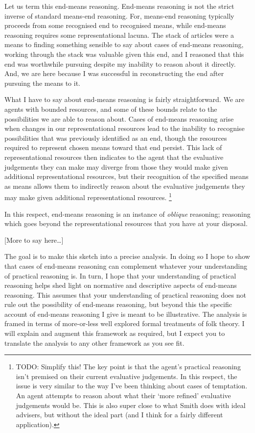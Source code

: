 \documentclass[10pt]{article}
\begin{document}
Let us term this end-means reasoning.
End-means reasoning is not the strict inverse of standard means-end reasoning.
For, means-end reasoning typically proceeds from some recognised end to recognised means, while end-means reasoning requires some representational lacuna.
The stack of articles were a means to finding something sensible to say about cases of end-means reasoning, working through the stack was valuable given this end, and I reasoned that this end was worthwhile pursuing despite my inability to reason about it directly.
And, we are here because I was successful in reconstructing the end after pursuing the means to it.

What I have to say about end-means reasoning is fairly straightforward.
We are agents with bounded resources, and some of these bounds relate to the possibilities we are able to reason about.
Cases of end-means reasoning arise when changes in our representational resources lead to the inability to recognise possibilities that was previously identified as an end, though the resources required to represent chosen means toward that end persist.
This lack of representational resources then indicates to the agent that the evaluative judgements they can make may diverge from those they would make given additional representational resources, but their recognition of the specified means as means allows them to indirectly reason about the evaluative judgements they may make given additional representational resources.\nolinebreak
\footnote{TODO: Simplify this! The key point is that the agent's practical reasoning isn't premised on their current evaluative judgements.
  In this respect, the issue is very similar to the way I've been thinking about cases of temptation.
  An agent attempts to reason about what their `more refined' evaluative judgements would be.
  This is also super close to what Smith does with ideal advisers, but without the ideal part (and I think for a fairly different application).
}

In this respect, end-means reasoning is an instance of \emph{oblique} reasoning; reasoning which goes beyond the representational resources that you have at your disposal.
\begin{center}
  [More to say here\dots]
\end{center}

The goal is to make this sketch into a precise analysis.
In doing so I hope to show that cases of end-means reasoning can complement whatever your understanding of practical reasoning is.
In turn, I hope that your understanding of practical reasoning helps shed light on normative and descriptive aspects of end-means reasoning.
This assumes that your understanding of practical reasoning does not rule out the possibility of end-means reasoning, but beyond this the specific account of end-means reasoning I give is meant to be illustrative.
The analysis is framed in terms of more-or-less well explored formal treatments of folk theory.
I will explain and augment this framework as required, but I expect you to translate the analysis to any other framework as you see fit.
\end{document}
